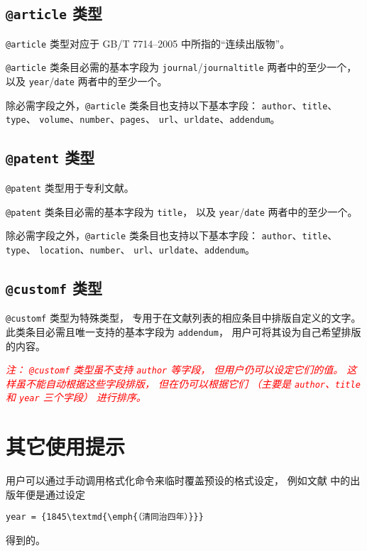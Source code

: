 \documentclass[UTF8, fancyhdr, hyperref]{ctexart}
\newcommand{\myemph}[1]{\emph{\textcolor{red}{#1}}}
\begin{document}
\subsection{\texttt{@article} 类型}

\verb|@article| 类型对应于 GB/T 7714--2005 中所指的“连续出版物”。

\verb|@article| 类条目必需的基本字段为
\verb|journal|/\verb|journaltitle| 两者中的至少一个，
以及 \verb|year|/\verb|date| 两者中的至少一个。

除必需字段之外，\verb|@article| 类条目也支持以下基本字段：
\verb|author|、\verb|title|、\verb|type|、
\verb|volume|、\verb|number|、\verb|pages|、
\verb|url|、\verb|urldate|、\verb|addendum|。

\subsection{\texttt{@patent} 类型}

\verb|@patent| 类型用于专利文献。

\verb|@patent| 类条目必需的基本字段为 \verb|title|，
以及 \verb|year|/\verb|date| 两者中的至少一个。

除必需字段之外，\verb|@article| 类条目也支持以下基本字段：
\verb|author|、\verb|title|、\verb|type|、
\verb|location|、\verb|number|、
\verb|url|、\verb|urldate|、\verb|addendum|。

\subsection{\texttt{@customf} 类型}

\verb|@customf| 类型为特殊类型，
专用于在文献列表的相应条目中排版自定义的文字。
此类条目必需且唯一支持的基本字段为 \verb|addendum|，
用户可将其设为自己希望排版的内容。

\myemph{%
	注：
	\texttt{@customf} 类型虽不支持 \texttt{author} 等字段，
	但用户仍可以设定它们的值。
	这样虽不能自动根据这些字段排版，
	但在仍可以根据它们
	（主要是 \texttt{author}、\texttt{title} 和 \texttt{year} 三个字段）
	进行排序。 %
}

\section{其它使用提示}

用户可以通过手动调用格式化命令来临时覆盖预设的格式设定，
例如文献 \parencite{1-7} 中的出版年便是通过设定
\begin{Verbatim}[frame = single]
year = {1845\textmd{\emph{（清同治四年）}}}
\end{Verbatim}
得到的。
\end{document}
